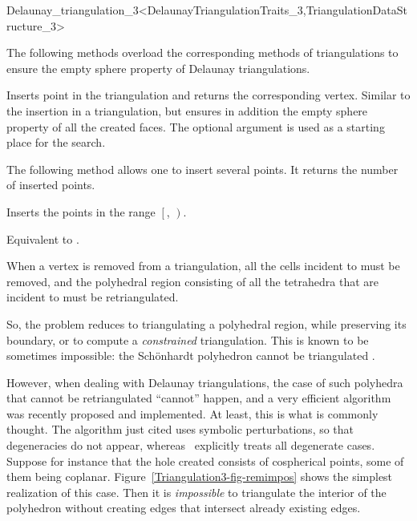 \begin{ccRefClass}{Delaunay_triangulation_3<DelaunayTriangulationTraits_3,TriangulationDataStructure_3>}
\ccOperations


The following methods overload the corresponding methods of
triangulations to ensure the empty sphere property of Delaunay 
triangulations.

{Inserts point  in the triangulation and returns the corresponding
 vertex. Similar to the insertion in a triangulation, but ensures in
addition the empty sphere property of all the created faces.
The optional argument  is used as a starting place for the search.}

The following method allows one to insert several points. It returns the
number of inserted points. 

{Inserts the points in the range $\left[\right.$,
$\left.\right)$. 
}

{Equivalent to .}


When a vertex  is removed from a triangulation, all the cells
incident to  must be removed, and the polyhedral region
consisting of all the tetrahedra that are incident to  must be
retriangulated. 

So, the problem reduces to triangulating a polyhedral
region, while preserving its boundary, or to compute a
\textit{constrained} triangulation. This is known to be sometimes
impossible: the Sch\"onhardt polyhedron cannot be triangulated
\cite{s-cgehd-98}. 

However, when dealing with Delaunay triangulations, the case of such
polyhedra that cannot be retriangulated ``cannot'' happen, and a very
efficient algorithm was recently proposed \cite{d-ddt-99} and
implemented. At least, this is what is commonly thought. The algorithm 
just cited uses symbolic perturbations, so that degeneracies do not
appear, whereas \cgal\ explicitly treats all degenerate cases.
Suppose for instance that the hole created consists of cospherical
points, some of them being coplanar.
Figure~\ref{Triangulation3-fig-remimpos} shows the simplest
realization of this case. Then it is \textit{impossible} to
triangulate the interior of the polyhedron without creating edges that
intersect already existing edges.


\end{ccRefClass}
